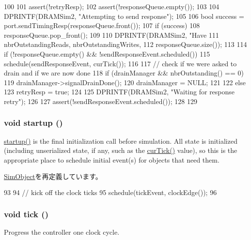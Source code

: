 \begin{DoxyCode}
100 {
101     assert(!retryResp);
102     assert(!responseQueue.empty());
103 
104     DPRINTF(DRAMSim2, "Attempting to send response\n");
105 
106     bool success = port.sendTimingResp(responseQueue.front());
107     if (success) {
108         responseQueue.pop_front();
109 
110         DPRINTF(DRAMSim2, "Have %
111                 nbrOutstandingReads, nbrOutstandingWrites,
112                 responseQueue.size());
113 
114         if (!responseQueue.empty() && !sendResponseEvent.scheduled())
115             schedule(sendResponseEvent, curTick());
116 
117         // check if we were asked to drain and if we are now done
118         if (drainManager && nbrOutstanding() == 0) {
119             drainManager->signalDrainDone();
120             drainManager = NULL;
121         }
122     } else {
123         retryResp = true;
124 
125         DPRINTF(DRAMSim2, "Waiting for response retry\n");
126 
127         assert(!sendResponseEvent.scheduled());
128     }
129 }
\end{DoxyCode}
\hypertarget{classDRAMSim2_aecc7d8debf54990ffeaaed5bac7d7d81}{
\subsubsection[{startup}]{\setlength{\rightskip}{0pt plus 5cm}void startup ()}}
\label{classDRAMSim2_aecc7d8debf54990ffeaaed5bac7d7d81}
\hyperlink{classDRAMSim2_aecc7d8debf54990ffeaaed5bac7d7d81}{startup()} is the final initialization call before simulation. All state is initialized (including unserialized state, if any, such as the \hyperlink{statistics_8hh_a7acdccbf0d35ce0c159c0cdd36371b22}{curTick()} value), so this is the appropriate place to schedule initial event(s) for objects that need them. 

\hyperlink{classSimObject_aecc7d8debf54990ffeaaed5bac7d7d81}{SimObject}を再定義しています。


\begin{DoxyCode}
93 {
94     // kick off the clock ticks
95     schedule(tickEvent, clockEdge());
96 }
\end{DoxyCode}
\hypertarget{classDRAMSim2_a873dd91783f9efb4a590aded1f70d6b0}{
\subsubsection[{tick}]{\setlength{\rightskip}{0pt plus 5cm}void tick ()}}
\label{classDRAMSim2_a873dd91783f9efb4a590aded1f70d6b0}
Progress the controller one clock cycle. 


